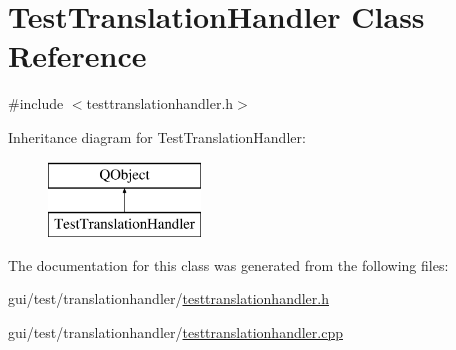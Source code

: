 \hypertarget{class_test_translation_handler}{\section{Test\-Translation\-Handler Class Reference}
\label{class_test_translation_handler}
}


{\ttfamily \#include $<$testtranslationhandler.\-h$>$}

Inheritance diagram for Test\-Translation\-Handler\-:\begin{figure}[H]
\begin{center}
\leavevmode
\includegraphics[height=2.000000cm]{class_test_translation_handler}
\end{center}
\end{figure}


The documentation for this class was generated from the following files\-:\begin{DoxyCompactItemize}
\item 
gui/test/translationhandler/\hyperlink{testtranslationhandler_8h}{testtranslationhandler.\-h}\item 
gui/test/translationhandler/\hyperlink{testtranslationhandler_8cpp}{testtranslationhandler.\-cpp}\end{DoxyCompactItemize}
